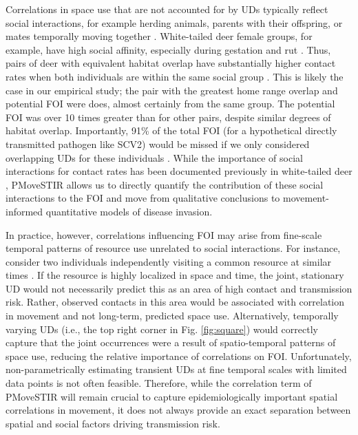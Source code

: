 \documentclass[letterpaper]{article}
\begin{document}

Correlations in space use that are not accounted for by UDs typically reflect social interactions, for example
herding animals, parents with their offspring, or mates temporally moving together \citep{DeYoung2011,Scharf2016,Yang2021}. 
White-tailed deer female groups, for example, have high social affinity, especially during gestation and rut \citep{DeYoung2011,Koen2017}. Thus, pairs of deer with equivalent habitat overlap have substantially higher contact rates when both individuals are within the same social group \citep{Schauber2007a,Kjaer2008,Schauber2015a,Grear2010}. This is likely the case in our empirical study; the pair with the greatest home range overlap and potential FOI were does, almost certainly from the same group. The potential FOI was over 10 times greater than for other pairs, despite similar degrees of habitat overlap. Importantly, 91\% of the total FOI (for a hypothetical directly transmitted pathogen like SCV2) would be missed if we only considered overlapping UDs for these individuals \citep[e.g., using a metric like CDE][]{Noonan2021}. While the importance of social interactions for contact rates has been documented previously in white-tailed deer \citep{Grear2010,Schauber2015a}, PMoveSTIR allows us to directly quantify the contribution of these social interactions to the FOI and move from qualitative conclusions to movement-informed quantitative models of disease invasion.

In practice, however, correlations influencing FOI may arise from fine-scale temporal patterns of resource use unrelated to social interactions. For instance, consider two individuals independently visiting a common resource at similar times \citep[e.g., a watering hole,][]{VanderWaal2017}. If the resource is highly localized in space and time, the joint, stationary UD would not necessarily predict this as an area of high contact and transmission risk. Rather, observed contacts in this area would be associated with correlation in movement and not long-term, predicted space use.
Alternatively, temporally varying UDs (i.e., the top right corner in Fig. \ref{fig:square}) would correctly capture that the joint occurrences were a result of spatio-temporal patterns of space use, reducing the relative importance of correlations on FOI. Unfortunately, non-parametrically estimating transient UDs at fine temporal scales with limited data points is not often feasible. Therefore, while the correlation term of PMoveSTIR will remain crucial to capture epidemiologically important spatial correlations in movement, it does not always provide an exact separation between spatial and social factors driving transmission risk.
\end{document}
